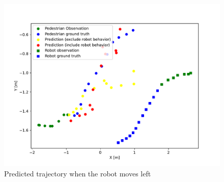 \vspace{-30pt}

\begin{figure}[H]
  \centering
 \includegraphics[keepaspectratio, scale=0.58]
      {images/pred_left.pdf}
\caption{Predicted trajectory when the robot moves left}
 \label{Fig:pred-left}
\end{figure}

\newpage
